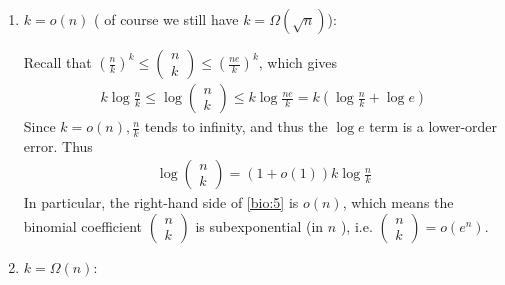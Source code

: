 \documentclass{article}
\begin{document}
\begin{enumerate}
    \item $k=o(n)$ ( of course we still have $k=\Omega (\sqrt{n})$):
    
Recall that $\left(\frac{n}{k}\right)^{k} \leq\left(\begin{array}{c}n \\ k\end{array}\right) \leq\left(\frac{n e}{k}\right)^{k}$, which gives
\begin{align*}
k \log \frac{n}{k} \leq \log \left(\begin{array}{l}
n \\
k
\end{array}\right) \leq k \log \frac{n e}{k}=k\left(\log \frac{n}{k}+\log e\right)
\end{align*}
Since $k=o(n), \frac{n}{k}$ tends to infinity, and thus the $\log e$ term is a lower-order error. Thus
\begin{align}
\log \left(\begin{array}{l}
n \\
k
\end{array}\right)=(1+o(1)) k \log \frac{n}{k} \label{bio:5}
\end{align}
In particular, the right-hand side of \cref{bio:5} is $o(n)$, which means the binomial coefficient
$\left(\begin{array}{l}n \\ k\end{array}\right)$ is subexponential (in $n$ ), i.e. $\left(\begin{array}{l}n \\ k\end{array}\right)=o(e^n)$.

\item $k=\Omega(n)$:


\end{enumerate}
\end{document}
